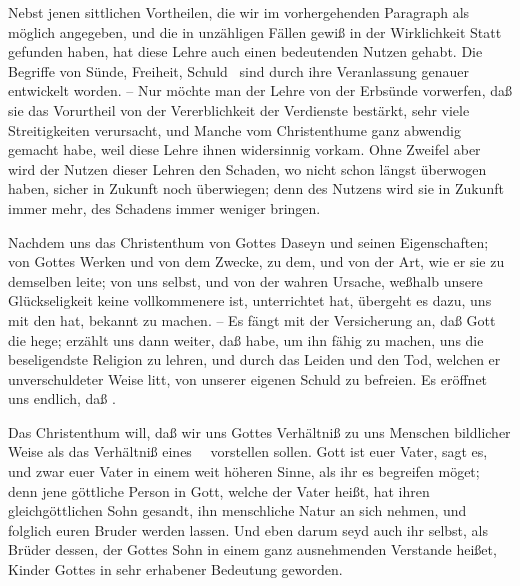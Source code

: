 Nebst jenen sittlichen Vortheilen, die wir im vorhergehenden Paragraph als möglich angegeben, und die in unzähligen Fällen gewiß in der Wirklichkeit Statt gefunden haben, hat diese Lehre auch einen bedeutenden  Nutzen gehabt. Die Begriffe von Sünde, Freiheit, Schuld \usw\ sind durch ihre Veranlassung genauer entwickelt worden. -- Nur möchte man der Lehre von der Erbsünde vorwerfen, daß sie das Vorurtheil von der Vererblichkeit der Verdienste bestärkt, sehr viele Streitigkeiten verursacht, und Manche vom Christenthume ganz abwendig gemacht habe, weil diese Lehre ihnen widersinnig vorkam. Ohne Zweifel aber wird der Nutzen dieser Lehren den Schaden, wo nicht schon längst überwogen haben, sicher in Zukunft noch überwiegen; denn des Nutzens wird sie in Zukunft immer mehr, des Schadens immer weniger bringen.

Nachdem uns das Christenthum von Gottes Daseyn und seinen Eigenschaften; von Gottes Werken und von dem Zwecke, zu dem, und von der Art, wie er sie zu demselben leite; von uns selbst, und von der wahren Ursache, weßhalb unsere Glückseligkeit keine vollkommenere ist, unterrichtet hat, übergeht es dazu, uns mit den  hat, bekannt zu machen. -- Es fängt mit der Versicherung an, daß Gott die  hege; erzählt uns dann weiter, daß  habe, um ihn fähig zu machen, uns die beseligendste Religion zu lehren, und durch das Leiden und den Tod, welchen er unverschuldeter Weise litt, von unserer eigenen Schuld zu befreien. Es eröffnet uns endlich, daß .

Das Christenthum will, daß wir uns Gottes Verhältniß zu uns Menschen bildlicher Weise als das Verhältniß eines~\  vorstellen sollen. Gott ist euer Vater, sagt es, und zwar euer Vater in einem weit höheren Sinne, als ihr es begreifen möget; denn jene göttliche Person in Gott, welche der Vater heißt, hat ihren gleichgöttlichen Sohn gesandt, ihn menschliche Natur an sich nehmen, und folglich euren Bruder werden lassen. Und eben darum seyd auch ihr selbst, als Brüder dessen, der Gottes Sohn in einem ganz ausnehmenden Verstande heißet, Kinder Gottes in sehr erhabener Bedeutung geworden.

